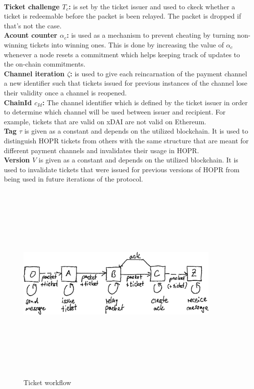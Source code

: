 \\\textbf{Ticket challenge $T_c$:}  is set by the ticket issuer and used to ckeck whether a ticket is redeemable before the packet is been relayed. The packet is dropped if that's not the case.
\\\textbf{Acount counter $\alpha_c$:} is used as a mechanism to prevent cheating by turning non-winning tickets into winning ones. This is done by increasing the value of $\alpha_c$ whenever a node resets a commitment which helps keeping track of updates to the on-chain commitments.
\\\textbf{Channel iteration $\zeta$:} is used to give each reincarnation of the payment channel a new identifier such that tickets issued for previous instances of the channel lose their validity once a channel is reopened.
\\\textbf{ChainId $c_{Id}$:} The channel identifier which is defined by the ticket issuer in order to determine which channel will be used between issuer and recipient. For example, tickets that are valid on xDAI are not valid on Ethereum.
\\\textbf{Tag $\tau$} is given as a constant and depends on the utilized blockchain. It is used to distinguish HOPR tickets from others with the same structure that are meant for different payment channels and invalidates their usage in HOPR.
\\\textbf{Version $V$} is given as a constant and depends on the utilized blockchain. It is used to invalidate tickets that were issued for previous versions of HOPR from being used in future iterations of the protocol.


 \begin{figure}[H]
    \centering
    \includegraphics[width=10cm,height=10cm,keepaspectratio]{../yellowpaper/images/ticket_workflow.png}
    \caption{Ticket workflow}
    \label{fig:Ticket worklow}
\end{figure}

